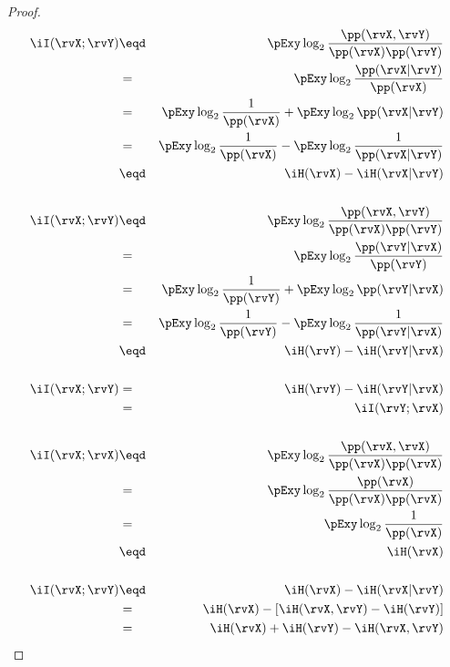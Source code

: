 \begin{theorem}
\end{theorem}
\begin{proof}
\begin{eqnarray*}
  \iI(\rvX;\rvY)
    &\eqd& \pExy \log_2 \frac{ \pp(\rvX,\rvY) }{\pp(\rvX)\pp(\rvY)}
  \\&=&    \pExy \log_2 \frac{ \pp(\rvX|\rvY) }{\pp(\rvX)}
  \\&=&    \pExy \log_2 \frac{ 1 }{\pp(\rvX)} + \pExy \log_2 \pp(\rvX|\rvY) 
  \\&=&    \pExy \log_2 \frac{ 1 }{\pp(\rvX)} - \pExy \log_2 \frac{1}{\pp(\rvX|\rvY)}
  \\&\eqd& \iH(\rvX) - \iH(\rvX|\rvY)
\\
\\
  \iI(\rvX;\rvY)
    &\eqd& \pExy \log_2 \frac{ \pp(\rvX,\rvY) }{\pp(\rvX)\pp(\rvY)}
  \\&=&    \pExy \log_2 \frac{ \pp(\rvY|\rvX) }{\pp(\rvY)}
  \\&=&    \pExy \log_2 \frac{ 1 }{\pp(\rvY)} + \pExy \log_2 \pp(\rvY|\rvX) 
  \\&=&    \pExy \log_2 \frac{ 1 }{\pp(\rvY)} - \pExy \log_2 \frac{1}{\pp(\rvY|\rvX)}
  \\&\eqd& \iH(\rvY) - \iH(\rvY|\rvX)
\\
\\
  \iI(\rvX;\rvY)
    &=&    \iH(\rvY) - \iH(\rvY|\rvX)
  \\&=&    \iI(\rvY;\rvX)
\\
\\
  \iI(\rvX;\rvX)
    &\eqd& \pExy \log_2 \frac{ \pp(\rvX,\rvX) }{\pp(\rvX)\pp(\rvX)}
  \\&=&    \pExy \log_2 \frac{ \pp(\rvX)   }{\pp(\rvX)\pp(\rvX)}
  \\&=&    \pExy \log_2 \frac{ 1        }{\pp(\rvX)      }
  \\&\eqd& \iH(\rvX)
\\
\\
  \iI(\rvX;\rvY)
    &\eqd& \iH(\rvX) - \iH(\rvX|\rvY)
  \\&=&    \iH(\rvX) - [ \iH(\rvX,\rvY) - \iH(\rvY) ]
  \\&=&    \iH(\rvX) + \iH(\rvY) - \iH(\rvX,\rvY) 
\end{eqnarray*}
\end{proof}

